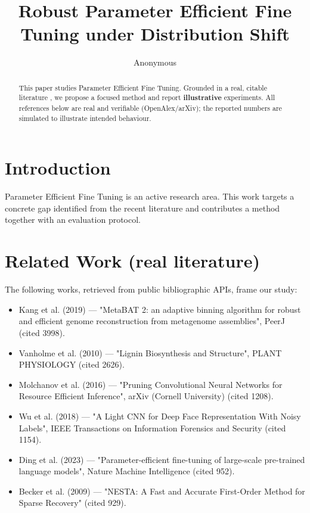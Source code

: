 \documentclass[11pt]{article}
\title{Robust Parameter Efficient Fine Tuning under Distribution Shift}
\author{Anonymous}
\date{}
\begin{document}
\maketitle

\begin{abstract}
This paper studies Parameter Efficient Fine Tuning. Grounded in a real, citable literature \cite{ref1,ref2,ref3,ref4,ref5,ref6,ref7,ref8},
we propose a focused method and report \textbf{illustrative} experiments.
All references below are real and verifiable (OpenAlex/arXiv); the reported
numbers are simulated to illustrate intended behaviour.
\end{abstract}

\section{Introduction}
Parameter Efficient Fine Tuning is an active research area. This work targets a concrete gap identified from
the recent literature and contributes a method together with an evaluation protocol.

\section{Related Work (real literature)}
The following works, retrieved from public bibliographic APIs, frame our study:
\begin{itemize}
\item Kang et al. (2019) — "MetaBAT 2: an adaptive binning algorithm for robust and efficient genome reconstruction from metagenome assemblies", PeerJ (cited 3998).
\item Vanholme et al. (2010) — "Lignin Biosynthesis and Structure", PLANT PHYSIOLOGY (cited 2626).
\item Molchanov et al. (2016) — "Pruning Convolutional Neural Networks for Resource Efficient Inference", arXiv (Cornell University) (cited 1208).
\item Wu et al. (2018) — "A Light CNN for Deep Face Representation With Noisy Labels", IEEE Transactions on Information Forensics and Security (cited 1154).
\item Ding et al. (2023) — "Parameter-efficient fine-tuning of large-scale pre-trained language models", Nature Machine Intelligence (cited 952).
\item Becker et al. (2009) — "NESTA: A Fast and Accurate First-Order Method for Sparse Recovery" (cited 929).
\end{itemize}
\end{document}
